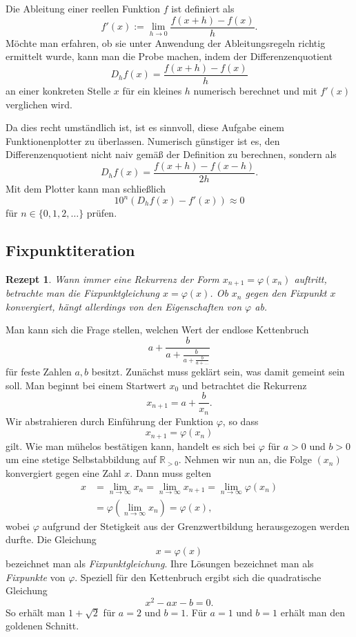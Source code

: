 \documentclass[a4paper,10pt,fleqn,twocolumn,twoside,dvipdfmx]{scrartcl}
\theoremstyle{rmbox}
\newtheorem{Rezept}{Rezept}[section]
\newcommand{\R}{\mathbb R}
\begin{document}
\noindent
Die Ableitung einer reellen Funktion $f$ ist definiert als%
\[f'(x) := \lim_{h\to 0}\frac{f(x+h)-f(x)}{h}.\]
Möchte man erfahren, ob sie unter Anwendung
der Ableitungsregeln richtig ermittelt wurde, kann man die Probe
machen, indem der Differenzenquotient%
\[D_h f(x) = \frac{f(x+h)-f(x)}{h}\]
an einer konkreten Stelle $x$ für ein kleines $h$ numerisch
berechnet und mit $f'(x)$ verglichen wird.

Da dies recht umständlich ist, ist es sinnvoll, diese Aufgabe einem
Funktionenplotter zu überlassen. Numerisch günstiger ist es, den
Differenzenquotient nicht naiv gemäß der Definition zu berechnen,
sondern als%
\[D_h f(x) = \frac{f(x+h)-f(x-h)}{2h}.\]
Mit dem Plotter kann man schließlich
\[10^n (D_h f(x) - f'(x)) \approx 0\]
für $n\in\{0,1,2,\ldots\}$ prüfen.

\subsection{Fixpunktiteration}

\begin{Rezept}
Wann immer eine Rekurrenz der Form $x_{n+1} = \varphi(x_n)$
auftritt, betrachte man die Fixpunktgleichung $x = \varphi(x)$. Ob
$x_n$ gegen den Fixpunkt $x$ konvergiert, hängt allerdings von den
Eigenschaften von $\varphi$ ab.
\end{Rezept}

\noindent
Man kann sich die Frage stellen, welchen Wert der endlose
Kettenbruch
\[a+\frac{b}{a+\frac{b}{a+\frac{b}{a+\ldots}}}\]
für feste Zahlen $a,b$ besitzt. Zunächst muss geklärt sein, was
damit gemeint sein soll. Man beginnt bei einem Startwert $x_0$
und betrachtet die Rekurrenz
\[x_{n+1} = a+\frac{b}{x_n}.\]
Wir abstrahieren durch Einführung der Funktion $\varphi$, so dass
\[x_{n+1} = \varphi(x_n)\]
gilt. Wie man mühelos bestätigen kann, handelt es sich bei $\varphi$
für $a>0$ und $b>0$ um eine stetige Selbstabbildung auf $\R_{>0}$.
Nehmen wir nun an, die Folge $(x_n)$ konvergiert gegen eine Zahl $x$.
Dann muss gelten
\begin{align*}
x &= \lim_{n\to\infty} x_{n} = \lim_{n\to\infty} x_{n+1}
= \lim_{n\to\infty}\varphi(x_n)\\
&= \varphi(\lim_{n\to\infty} x_n) = \varphi(x),
\end{align*}
wobei $\varphi$ aufgrund der Stetigkeit aus der Grenzwertbildung
herausgezogen werden durfte. Die Gleichung
\[x = \varphi(x)\]
bezeichnet man als \emph{Fixpunktgleichung}. Ihre Lösungen
bezeichnet man als \emph{Fixpunkte} von $\varphi$. Speziell für den
Kettenbruch ergibt sich die quadratische Gleichung
\[x^2 - ax - b = 0.\]
So erhält man $1+\sqrt{2}$ für $a=2$ und $b=1$.
Für $a=1$ und $b=1$ erhält man den goldenen Schnitt.
\end{document}

